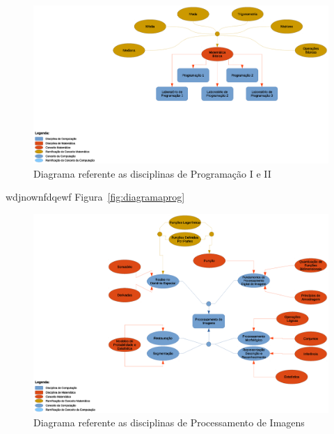\documentclass[12pt,a4paper]{article}
\begin{document}
\begin{figure}[htb]
	\centering
	\includegraphics[scale=0.35]{imagens/programacao.eps}
	\flushleft	 
	\caption{Diagrama referente as disciplinas de Programação I e II}
	\label{fig:diagramaProg}
\end{figure}

wdjnownfdqewf Figura~\ref{fig:diagramaprog} 

\begin{figure}[htb]
	\centering
	\includegraphics[scale=0.35]{imagens/processamentoDeImagens.eps} 
	\flushleft
	\caption{Diagrama referente as disciplinas de Processamento de Imagens}
	\label{fig:diagramaimg}
\end{figure}



\end{document}
